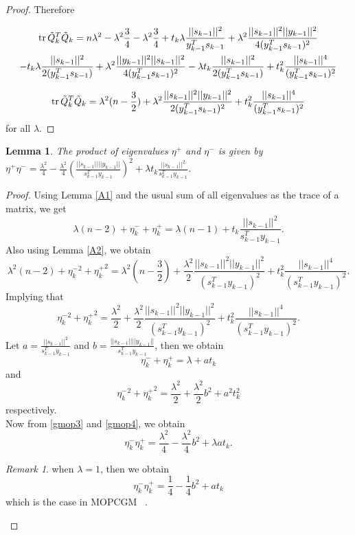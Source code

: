\documentclass{article}
\newtheorem{lemma}{Lemma}
\theoremstyle{remark}
\newtheorem{remark}{Remark}
\newcommand{\tr}{\operatorname{tr}}
\begin{document}
{\begin{proof}
Therefore

   \begin{multline*}
   \tr{\Tilde{Q}_k^T\Tilde{Q}_k}=n\lambda^2 -\lambda^2\frac{3}{4}-\lambda^2\frac{3}{4}+t_k\lambda\frac{||s_{k-1}||^2}{y_{k-1}^Ts_{k-1}}+\lambda^2\frac{||s_{k-1}||^2||y_{k-1}||^2}{4(y_{k-1}^Ts_{k-1})^2}\\-t_k\lambda\frac{||s_{k-1}||^2}{2(y_{k-1}^Ts_{k-1})}+\lambda^2\frac{||y_{k-1}||^2||s_{k-1}||^2}{4(y_{k-1}^Ts_{k-1})^2}-\lambda t_k\frac{||s_{k-1}||^2}{2(y_{k-1}^Ts_{k-1})}+t_k^2\frac{||s_{k-1}||^4}{(y_{k-1}^Ts_{k-1})^2}
   \end{multline*}

 \[
   \tr{\Tilde{Q}_k^T\Tilde{Q}_k}=\lambda^2(n-\frac{3}{2})+\lambda^2\frac{||s_{k-1}||^2||y_{k-1}||^2}{2(y_{k-1}^Ts_{k-1})^2}+t_k^2\frac{||s_{k-1}||^4}{(y_{k-1}^Ts_{k-1})^2}
   \]
   for all $\lambda$.
\end{proof}
\begin{lemma}
    \label{lemma:prodegnval}
    The product of eigenvalues $\eta^+$ and $\eta^-$ is given by $\eta^+\eta^-=\frac{\lambda^2}{4}-\frac{\lambda^2}{4}\left(\frac{||s_{k-1}||||y_{k-1}||}{s_{k-1}^Ty_{k-1}}\right)^2+\lambda t_k\frac{||s_{k-1}||^2}{s_{k-1}^Ty_{k-1}}$.
\end{lemma}
\begin{proof}
Using Lemma \ref{A1} and the usual sum of all eigenvalues as the trace of a matrix, we get
\[
\lambda (n-2)+\eta_k^-+\eta_k^+=\lambda (n-1)+t_k\frac{||s_{k-1}||^2}{s_{k-1}^Ty_{k-1}}.
\]
Also using Lemma \ref{A2}, we obtain
\[
\lambda^2 (n-2)+{\eta_k^-}^2+{\eta_k^+}^2=\lambda^2( n-\frac{3}{2})+\frac{\lambda^2}{2}\frac{||s_{k-1}||^2||y_{k-1}||^2}{(s_{k-1}^Ty_{k-1})^2}+t_k^2\frac{||s_{k-1}||^4}{(s_{k-1}^Ty_{k-1})^2}.
\]
 Implying that
 \begin{equation}
     {\eta_k^-}^2+{\eta_k^+}^2=\frac{\lambda^2}{2}+\frac{\lambda^2}{2}\frac{||s_{k-1}||^2||y_{k-1}||^2}{(s_{k-1}^Ty_{k-1})^2}+t_k^2\frac{||s_{k-1}||^4}{(s_{k-1}^Ty_{k-1})^2}.
 \end{equation}
 Let $a=\frac{||s_{k-1}||^2}{s_{k-1}^Ty_{k-1}}$ and $b=\frac{||s_{k-1}||||y_{k-1}||}{s_{k-1}^Ty_{k-1}}$, then we obtain
 \begin{equation}\label{gmop3}
     \eta_k^-+\eta_k^+=\lambda+at_k
 \end{equation} and 
 \begin{equation}\label{gmop4}
     {\eta_k^-}^2+{\eta_k^+}^2=\frac{\lambda^2}{2}+\frac{\lambda^2}{2}b^2+a^2t_k^2
 \end{equation}respectively.\\
 Now from \eqref{gmop3} and \eqref{gmop4}, we obtain
 \begin{equation}\label{gmop5}
     \eta_k^-\eta_k^+=\frac{\lambda^2}{4}-\frac{\lambda^2}{4}b^2+\lambda at_k.
 \end{equation}
 \begin{remark}
     when $\lambda=1$, then we obtain 
 \[
  \eta_k^-\eta_k^+=\frac{1}{4}-\frac{1}{4}b^2+at_k
 \]
 which is the case in {MOPCGM} ~\cite{sabi2023modified}.
 \end{remark}
\end{proof}


}
\end{document}

